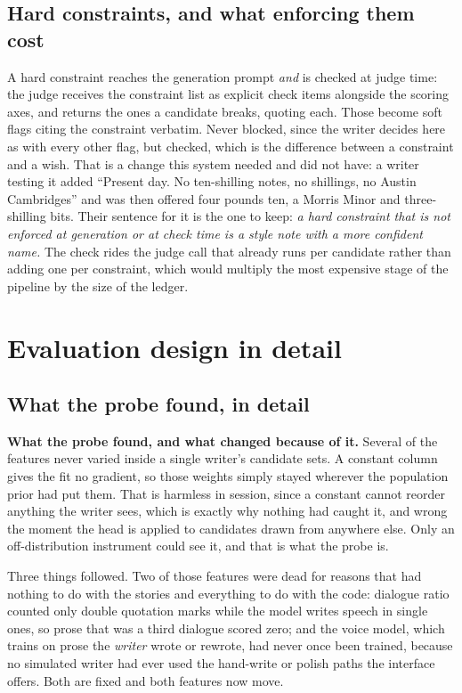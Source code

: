 \documentclass{article}
\begin{document}
\subsection{Hard constraints, and what enforcing them cost}

A hard constraint reaches the generation prompt \emph{and} is checked at judge time: the
judge receives the constraint list as explicit check items alongside the scoring axes, and
returns the ones a candidate breaks, quoting each. Those become soft flags citing the
constraint verbatim. Never blocked, since the writer decides here as with every
other flag, but checked, which is the difference between a constraint and a wish. That is a change this
system needed and did not have: a writer testing it added ``Present day. No ten-shilling
notes, no shillings, no Austin Cambridges'' and was then offered four pounds ten, a Morris
Minor and three-shilling bits. Their sentence for it is the one to keep: \emph{a hard
constraint that is not enforced at generation or at check time is a style note with a more
confident name.} The check rides the judge call that already runs per candidate rather than
adding one per constraint, which would multiply the most expensive stage of the pipeline by
the size of the ledger.


\section{Evaluation design in detail}
\label{app:eval}

\subsection{What the probe found, in detail}

\textbf{What the probe found, and what changed because of it.} Several of the
\rFeatures{} features never varied inside a single writer's candidate sets. A constant
column gives the fit no gradient, so those weights simply stayed wherever the population
prior had put them. That is harmless in session, since a constant cannot reorder anything
the writer sees, which is exactly why nothing had caught it, and wrong the moment the head
is applied to candidates drawn from anywhere else. Only an off-distribution instrument could
see it, and that is what the probe is.

Three things followed. Two of those features were dead for reasons that had nothing to do
with the stories and everything to do with the code: dialogue ratio counted only double
quotation marks while the model writes speech in single ones, so prose that was a third
dialogue scored zero; and the voice model, which trains on prose the \emph{writer} wrote or
rewrote, had never once been trained, because no simulated writer had ever used the
hand-write or polish paths the interface offers. Both are fixed and both features now move.
\end{document}
